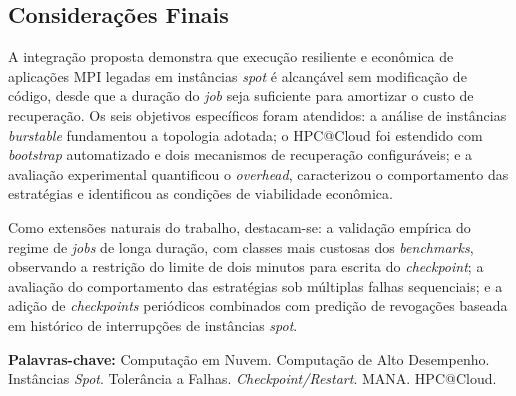 \begin{resumo}
\section*{Considerações Finais}

A integração proposta demonstra que execução resiliente e econômica de
aplicações MPI legadas em instâncias \textit{spot} é alcançável sem modificação
de código, desde que a duração do \textit{job} seja suficiente para amortizar o
custo de recuperação. Os seis objetivos específicos foram atendidos: a análise
de instâncias \textit{burstable} fundamentou a topologia adotada; o HPC@Cloud
foi estendido com \textit{bootstrap} automatizado e dois mecanismos de
recuperação configuráveis; e a avaliação experimental quantificou o
\textit{overhead}, caracterizou o comportamento das estratégias e identificou as
condições de viabilidade econômica.

Como extensões naturais do trabalho, destacam-se: a validação empírica do regime
de \textit{jobs} de longa duração, com classes mais custosas dos
\textit{benchmarks}, observando a restrição do limite de dois minutos para
escrita do \textit{checkpoint}; a avaliação do comportamento das estratégias
sob múltiplas falhas sequenciais; e a adição de \textit{checkpoints} periódicos
combinados com predição de revogações baseada em histórico de interrupções de
instâncias \textit{spot}.

\vspace{\baselineskip}
\textbf{Palavras-chave:} Computação em Nuvem. Computação de Alto Desempenho.
Instâncias \textit{Spot}. Tolerância a Falhas. \textit{Checkpoint/Restart}.
MANA. HPC@Cloud.
\end{resumo}


